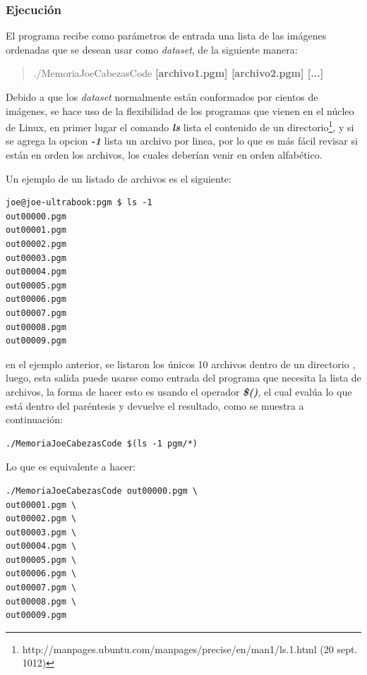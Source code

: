 \subsubsection{Ejecución}
\label{ch:propuesta:sec:extraccionDeLaSuperficie:subsec:ejecucion}

El programa recibe como parámetros de entrada una lista de las imágenes ordenadas que se desean usar como \emph{dataset}, de la siguiente manera:

\begin{quote}
./MemoriaJoeCabezasCode \textbf{[archivo1.pgm] [archivo2.pgm] [...]}
\end{quote}

Debido a que los \emph{dataset} normalmente están conformados por cientos de imágenes, se hace uso de la flexibilidad de los programas que vienen en el núcleo de Linux, en primer lugar el comando \textbf{\emph{ls}} lista el contenido de un directorio\footnote{http://manpages.ubuntu.com/manpages/precise/en/man1/ls.1.html (20 sept. 1012)}, y si se agrega la opcion \textbf{\emph{-1}} lista un archivo por linea, por lo que es más fácil revisar si están en orden los archivos, los cuales deberían venir en orden alfabético.

Un ejemplo de un listado de archivos es el siguiente:

\begin{verbatim}
joe@joe-ultrabook:pgm $ ls -1
out00000.pgm
out00001.pgm
out00002.pgm
out00003.pgm
out00004.pgm
out00005.pgm
out00006.pgm
out00007.pgm
out00008.pgm
out00009.pgm
\end{verbatim}

en el ejemplo anterior, se listaron los únicos 10 archivos dentro de un directorio , luego, esta salida puede usarse como entrada del programa que necesita la lista de archivos, la forma de hacer esto es usando el operador \textbf{\emph{\$()}}, el cual evalúa lo que está dentro del paréntesis y devuelve el resultado, como se muestra a continuación:

\begin{verbatim}
./MemoriaJoeCabezasCode $(ls -1 pgm/*)
\end{verbatim}

Lo que es equivalente a hacer:

\begin{verbatim}
./MemoriaJoeCabezasCode out00000.pgm \
out00001.pgm \
out00002.pgm \
out00003.pgm \
out00004.pgm \
out00005.pgm \
out00006.pgm \
out00007.pgm \
out00008.pgm \
out00009.pgm
\end{verbatim}

